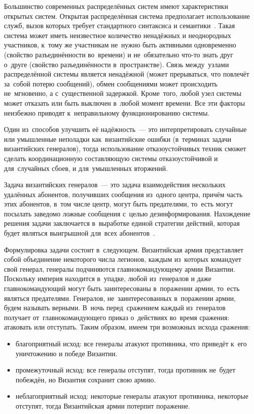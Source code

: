 Большинство современных распределённых систем имеют характеристики открытых систем. Открытая распределённая система предполагает использование служб, вызов которых требует стандартного синтаксиса и семантики~\autocite{Kosyakov}. Такая система может иметь неизвестное количество ненадёжных и неоднородных участников, к~тому же участникам не~нужно быть активными одновременно (свойство разъединённости во~времени) и не~обязательно что-то знать друг о~друге (свойство разъединённости в~пространстве). Связь между~узлами распределённой системы является ненадёжной (может прерываться, что повлечёт за~собой потерю сообщений), обмен сообщениями может происходить не~мгновенно, а с~существенной задержкой. Кроме~того, любой узел системы может отказать или быть выключен в~любой момент времени. Все эти факторы неизбежно приводят к~неправильному функционированию системы.

Один из~способов улучшить её надёжность~--- это интерпретировать случайные или умышленные неполадки как~византийские ошибки (в~терминах задачи византийских генералов), тогда использование отказоустойчивых техник сможет сделать координационную составляющую системы отказоустойчивой и для~случайных сбоев, и для~умышленных вторжений.

Задача византийских генералов~--- это задача взаимодействия нескольких удалённых абонентов, получивших сообщения из~одного центра, причём часть этих абонентов, в~том числе центр, могут быть предателями, то~есть могут посылать заведомо ложные сообщения с~целью дезинформирования. Нахождение решения задачи заключается в~выработке единой стратегии действий, которая будет являться выигрышной для~всех абонентов~\autocite{byzgen}.

Формулировка задачи состоит в~следующем. Византийская армия представляет собой объединение некоторого числа легионов, каждым из~которых командует свой генерал, генералы подчиняются главнокомандующему армии Византии. Поскольку империя находится в~упадке, любой из~генералов и даже главнокомандующий могут быть заинтересованы в~поражении армии, то~есть являться предателями. Генералов, не~заинтересованных в~поражении армии, будем называть верными. В~ночь перед~сражением каждый из~генералов получает от~главнокомандующего приказ о~действиях во~время сражения: атаковать или отступать. Таким образом, имеем три возможных исхода сражения:
\begin{itemize}
	\item благоприятный исход: все генералы атакуют противника, что приведёт к~его уничтожению и победе Византии.
	\item промежуточный исход: все генералы отступят, тогда противник не~будет побеждён, но Византия сохранит свою армию.
	\item неблагоприятный исход: некоторые генералы атакуют противника, некоторые отступят, тогда Византийская армии потерпит поражение.
\end{itemize}

